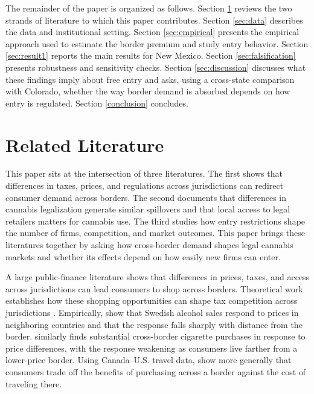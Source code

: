 \documentclass[english,12pt]{article}
\begin{document}
The remainder of the paper is organized as follows. Section \ref{litreview} reviews the two strands of literature to which this paper contributes. Section \ref{sec:data} describes the data and institutional setting. Section \ref{sec:empirical} presents the empirical approach used to estimate the border premium and study entry behavior. Section \ref{sec:result1} reports the main results for New Mexico. Section \ref{sec:falsification} presents robustness and sensitivity checks. Section \ref{sec:discussion} discusses what these findings imply about free entry and asks, using a cross-state comparison with Colorado, whether the way border demand is absorbed depends on how entry is regulated. Section \ref{conclusion} concludes.

\section{Related Literature}
\label{litreview}

This paper sits at the intersection of three literatures. The first shows that differences in taxes, prices, and regulations across jurisdictions can redirect consumer demand across borders. The second documents that differences in cannabis legalization generate similar spillovers and that local access to legal retailers matters for cannabis use. The third studies how entry restrictions shape the number of firms, competition, and market outcomes. This paper brings these literatures together by asking how cross-border demand shapes legal cannabis markets and whether its effects depend on how easily new firms can enter.


A large public-finance literature shows that differences in prices, taxes, and access across jurisdictions can lead consumers to shop across borders.
Theoretical work establishes how these shopping opportunities can shape tax competition across jurisdictions \cite{KanburKeen1993}. Empirically, \cite{AsplundFribergWilander2007} show that Swedish alcohol sales respond to prices in neighboring countries and that the response falls sharply with distance from the border. \cite{Lovenheim2008} similarly finds substantial cross-border cigarette purchases in response to price differences, with the response weakening as consumers live farther from a lower-price border. Using Canada--U.S. travel data, \cite{ChandraHeadTappata2014} show more generally that consumers trade off the benefits of purchasing across a border against the cost of traveling there.
\end{document}

